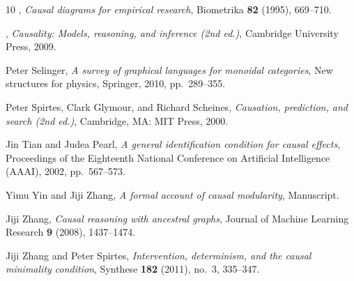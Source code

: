 \documentclass[12pt]{amsart}
\theoremstyle{plain}
\theoremstyle{definition}
\theoremstyle{remark}
\numberwithin{equation}{section}
\theoremstyle{plain}
\newcommand{\0}{\emptyset}
\begin{document}
\begin{thebibliography}{10}
\bysame, \emph{Causal diagrams for empirical research}, Biometrika \textbf{82}
  (1995), 669--710.

\bysame, \emph{Causality: Models, reasoning, and inference (2nd ed.)},
  Cambridge University Press, 2009.

Peter Selinger, \emph{A survey of graphical languages for monoidal categories},
  New structures for physics, Springer, 2010, pp.~289--355.

Peter Spirtes, Clark Glymour, and Richard Scheines, \emph{Causation,
  prediction, and search (2nd ed.)}, Cambridge, MA: MIT Press, 2000.

Jin Tian and Judea Pearl, \emph{A general identification condition for causal
  effects}, Proceedings of the Eighteenth National Conference on Artificial
  Intelligence (AAAI), 2002, pp.~567--573.

Yimu Yin and Jiji Zhang, \emph{A formal account of causal modularity},
  Manuscript.

Jiji Zhang, \emph{Causal reasoning with ancestral graphs}, Journal of Machine
  Learning Research \textbf{9} (2008), 1437--1474.

Jiji Zhang and Peter Spirtes, \emph{Intervention, determinism, and the causal
  minimality condition}, Synthese \textbf{182} (2011), no.~3, 335--347.

\end{thebibliography}
\end{document}
